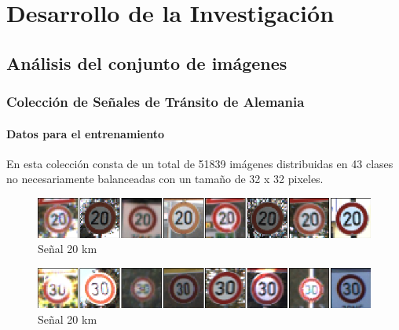 \chapter{Desarrollo de la Investigación}
\setcounter{page}{20}
\renewcommand{\baselinestretch}{2} %

\section{Análisis del conjunto de imágenes}

\subsection{Colección de Señales de Tránsito de Alemania}

\subsubsection{Datos para el entrenamiento}

En esta colección consta de un total de 51839 imágenes distribuidas en 43 clases no necesariamente balanceadas con un tamaño de 32 x 32 pixeles.

\begin{figure}[H]
	\begin{center}
	\includegraphics[width=1\textwidth]{images/desarrollo/imagenes/1_(1).png}
	\end{center}
	\begin{center}
	\caption{\small{Señal 20 km}}
	\end{center}
	\vspace{-1.5em}
\end{figure}

\begin{figure}[H]
	\begin{center}
	\includegraphics[width=1\textwidth]{images/desarrollo/imagenes/1_(2).png}
	\end{center}
	\begin{center}
	\caption{\small{Señal 20 km}}
	\end{center}
	\vspace{-1.5em}
\end{figure}

